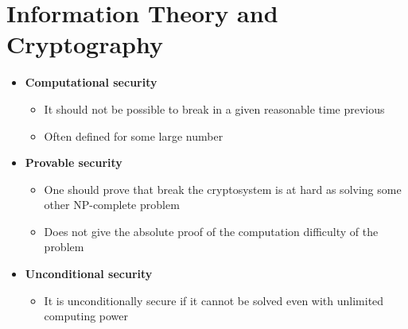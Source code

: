 \message{ !name(crypto-noter.tex)}\documentclass[a4, english]{article}
\begin{document}
\section{Information Theory and Cryptography} 
\begin{itemize}
  \item \textbf{Computational security} 
  \begin{itemize}
    \item It should not be possible to break in a given reasonable time previous
    \item Often defined for some large number
  \end{itemize}
  \item \textbf{Provable security} 
  \begin{itemize}
  	\item One should prove that break the cryptosystem is at hard as solving some other NP-complete problem
  	\item Does not give the absolute proof of the computation difficulty of the problem
  \end{itemize}
  \item \textbf{Unconditional security}
  \begin{itemize}
	  \item It is unconditionally secure if it cannot be solved even with unlimited computing power
  \end{itemize}
\end{itemize}
\end{document}
